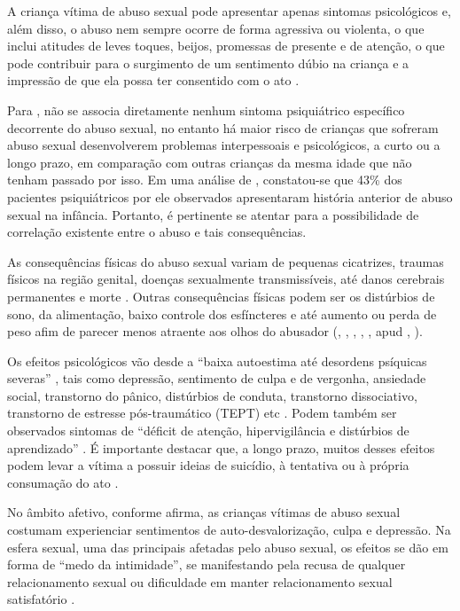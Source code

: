 A criança vítima de abuso sexual pode apresentar apenas sintomas psicológicos e, além disso, o abuso nem sempre ocorre de forma agressiva ou violenta, o que inclui atitudes de leves toques, beijos, promessas de presente e de atenção, o que pode contribuir para o surgimento de um sentimento dúbio na criança e a impressão de que ela possa ter consentido com o ato \cite{RAMOS2009}. 

Para , não se associa diretamente nenhum sintoma psiquiátrico específico decorrente do abuso sexual, no entanto há maior risco de crianças que sofreram abuso sexual desenvolverem problemas interpessoais e psicológicos, a curto ou a longo prazo, em comparação com outras crianças da mesma idade que não tenham passado por isso. Em uma análise de , constatou-se que 43\% dos pacientes psiquiátricos por ele observados apresentaram história anterior de abuso sexual na infância. Portanto, é pertinente se atentar para a possibilidade de correlação existente entre o abuso e tais consequências.

As consequências físicas do abuso sexual variam de  pequenas cicatrizes, traumas físicos na região genital, doenças sexualmente transmissíveis, até danos cerebrais permanentes e morte . Outras consequências físicas podem ser os distúrbios de sono, da alimentação, baixo controle dos esfíncteres e até aumento ou perda de peso afim de parecer menos atraente aos olhos do abusador (\citeauthor{IPPOLITO2003}, \citeyear{IPPOLITO2003}, \citeauthor{SANTOS1991}, \citeyear{SANTOS1991}, \citeauthor{VITIELLO1989}, \citeyear{VITIELLO1989} apud \citeauthor{JUNG2006}, \citeyear{JUNG2006}).

Os efeitos psicológicos vão desde a ``baixa autoestima até desordens psíquicas severas'' , tais como depressão, sentimento de culpa e de vergonha, ansiedade social, transtorno do pânico, distúrbios de conduta, transtorno dissociativo, transtorno de estresse pós-traumático (TEPT) etc . Podem também ser observados sintomas de ``déficit de atenção, hipervigilância e distúrbios de aprendizado'' . É importante destacar que, a longo prazo, muitos desses efeitos podem levar a vítima a possuir ideias de suicídio, à tentativa ou à própria consumação do ato .

No âmbito afetivo, conforme  afirma, as crianças vítimas de abuso sexual costumam experienciar sentimentos de auto-desvalorização, culpa e depressão. Na esfera sexual, uma das principais afetadas pelo abuso sexual, os efeitos se dão em forma de ``medo da intimidade'', se manifestando pela recusa de qualquer relacionamento sexual ou dificuldade em manter relacionamento sexual satisfatório . 


